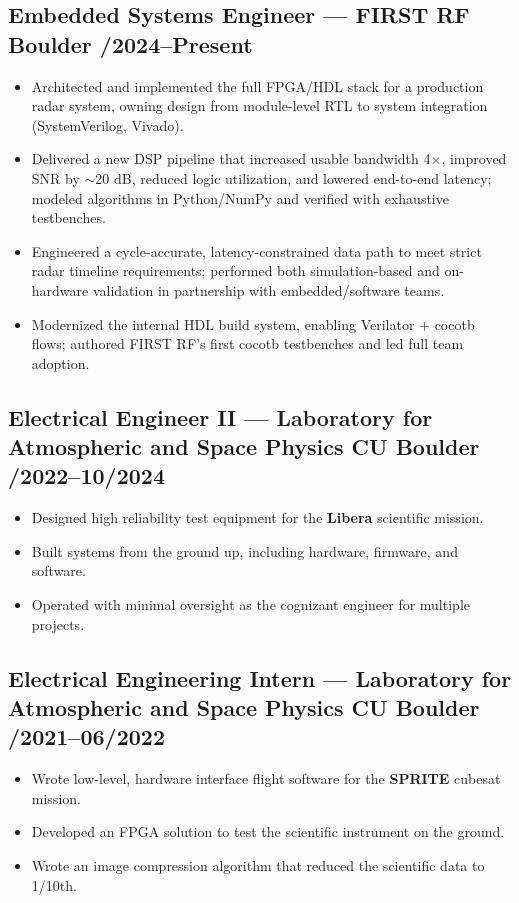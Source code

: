 \documentclass[11pt]{article}
\begin{document}
\subsection*{Embedded Systems Engineer --- FIRST RF \hfill Boulder /2024--Present}
\begin{itemize}[leftmargin=*]
\item Architected and implemented the full FPGA/HDL stack for a production radar system, owning design from module-level RTL to system integration (SystemVerilog, Vivado).
\item Delivered a new DSP pipeline that increased usable bandwidth 4$\times$, improved SNR by $\sim$20 dB, reduced logic utilization, and lowered end-to-end latency; modeled algorithms in Python/NumPy and verified with exhaustive testbenches.
\item Engineered a cycle-accurate, latency-constrained data path to meet strict radar timeline requirements; performed both simulation-based and on-hardware validation in partnership with embedded/software teams.
\item Modernized the internal HDL build system, enabling Verilator + cocotb flows; authored FIRST RF’s first cocotb testbenches and led full team adoption.
\end{itemize}

\subsection*{Electrical Engineer II --- Laboratory for Atmospheric and Space Physics \hfill CU Boulder /2022--10/2024}
\begin{itemize}[leftmargin=*]
\item Designed high reliability test equipment for the \textbf{Libera} scientific mission.
\item Built systems from the ground up, including hardware, firmware, and software.
\item Operated with minimal oversight as the cognizant engineer for multiple projects.
\end{itemize}

\subsection*{Electrical Engineering Intern --- Laboratory for Atmospheric and Space Physics \hfill CU Boulder /2021--06/2022}
\begin{itemize}[leftmargin=*]
\item Wrote low-level, hardware interface flight software for the \textbf{SPRITE} cubesat mission.
\item Developed an FPGA solution to test the scientific instrument on the ground.
\item Wrote an image compression algorithm that reduced the scientific data to 1/10th.
\end{itemize}
\end{document}

